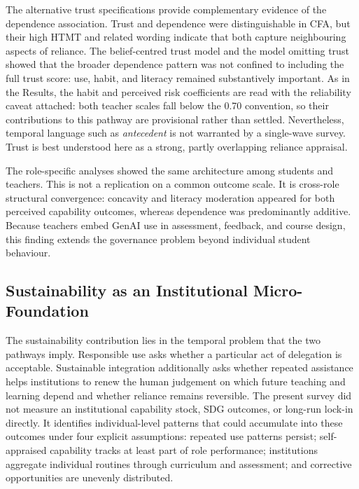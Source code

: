 \documentclass[sustainability,article,accept,moreauthors]{Definitions/mdpi}
\newif\ifmarkchanges
\DeclareRobustCommand{\rev}[1]{\ifmarkchanges{\hypersetup{linkcolor=blue,citecolor=blue,urlcolor=blue}\textcolor{black}{#1}}\else#1\fi}
\begin{document}
The alternative trust specifications provide complementary evidence of the dependence association. Trust and dependence were distinguishable in CFA, but their high HTMT and related wording indicate that both capture neighbouring aspects of reliance. The belief-centred trust model and the model omitting trust showed that the broader dependence pattern was not confined to including the full trust score: use, habit, and literacy remained substantively important. As in the Results, the habit and perceived risk coefficients are read with the reliability caveat attached: both teacher scales fall below the 0.70 convention, so their contributions to this pathway are provisional rather than settled. Nevertheless, temporal language such as \emph{antecedent} is not warranted by a single-wave survey. Trust is best understood here as a strong, partly overlapping reliance appraisal.

The role-specific analyses showed the same architecture among students and teachers. This is not a replication on a common outcome scale. It is cross-role structural convergence: concavity and literacy moderation appeared for both perceived capability outcomes, whereas dependence \rev{was predominantly} additive. Because teachers embed GenAI use in assessment, feedback, and course design, this finding extends the governance problem beyond individual student behaviour.

\subsection{Sustainability as an Institutional Micro-Foundation}\label{sec:sustainability}

The sustainability contribution lies in the temporal problem that the two pathways imply. Responsible use asks whether a particular act of delegation is acceptable. Sustainable integration additionally asks whether repeated assistance helps institutions to renew the human judgement on which future teaching and learning depend and whether reliance remains reversible. The present survey did not measure an institutional capability stock, SDG outcomes, or long-run lock-in directly. It identifies individual-level patterns that could accumulate into these outcomes under four explicit assumptions: repeated use patterns persist; self-appraised capability tracks at least part of role performance; institutions aggregate individual routines through curriculum and assessment; and corrective opportunities are unevenly distributed.
\end{document}

